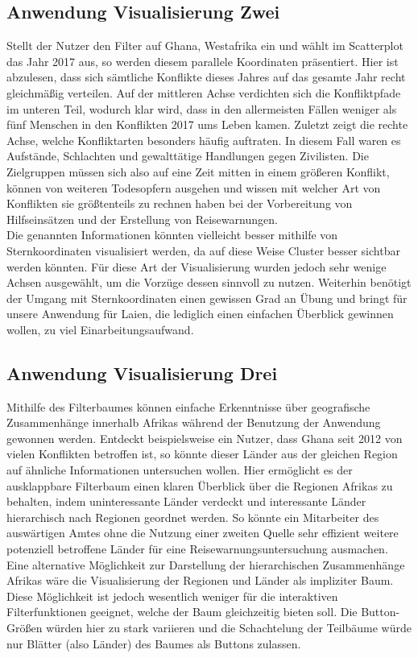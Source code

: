 \documentclass[usegeometry=true]{scrartcl}
\begin{document}
\subsection{Anwendung Visualisierung Zwei}
Stellt der Nutzer den Filter auf Ghana, Westafrika ein und wählt im Scatterplot das Jahr 2017 aus, so werden diesem parallele Koordinaten präsentiert. Hier ist abzulesen, dass sich sämtliche Konflikte dieses Jahres auf das gesamte Jahr recht gleichmäßig verteilen. Auf der mittleren Achse verdichten sich die Konfliktpfade im unteren Teil, wodurch klar wird, dass in den allermeisten Fällen weniger als fünf Menschen in den Konflikten 2017 ums Leben kamen. Zuletzt zeigt die rechte Achse, welche Konfliktarten besonders häufig auftraten. In diesem Fall waren es Aufstände, Schlachten und gewalttätige Handlungen gegen Zivilisten. Die Zielgruppen müssen sich also auf eine Zeit mitten in einem größeren Konflikt, können von weiteren Todesopfern ausgehen und wissen mit welcher Art von Konflikten sie größtenteils zu rechnen haben bei der Vorbereitung von Hilfseinsätzen und der Erstellung von Reisewarnungen.\\ Die genannten Informationen könnten vielleicht besser mithilfe von Sternkoordinaten visualisiert werden, da auf diese Weise Cluster besser sichtbar werden könnten. Für diese Art der Visualisierung wurden jedoch sehr wenige Achsen ausgewählt, um die Vorzüge dessen sinnvoll zu nutzen. Weiterhin benötigt der Umgang mit Sternkoordinaten einen gewissen Grad an Übung und bringt für unsere Anwendung für Laien, die lediglich einen einfachen Überblick gewinnen wollen, zu viel Einarbeitungsaufwand.\\

\subsection{Anwendung Visualisierung Drei}
Mithilfe des Filterbaumes können einfache Erkenntnisse über geografische Zusammenhänge innerhalb Afrikas während der Benutzung der Anwendung gewonnen werden. Entdeckt beispielsweise ein Nutzer, dass Ghana seit 2012 von vielen Konflikten betroffen ist, so könnte dieser Länder aus der gleichen Region auf ähnliche Informationen untersuchen wollen. Hier ermöglicht es der ausklappbare Filterbaum einen klaren Überblick über die Regionen Afrikas zu behalten, indem uninteressante Länder verdeckt und interessante Länder hierarchisch nach Regionen geordnet werden. So könnte ein Mitarbeiter des auswärtigen Amtes ohne die Nutzung einer zweiten Quelle sehr effizient weitere potenziell betroffene Länder für eine Reisewarnungsuntersuchung ausmachen.\\ Eine alternative Möglichkeit zur Darstellung der hierarchischen Zusammenhänge Afrikas wäre die Visualisierung der Regionen und Länder als impliziter Baum. Diese Möglichkeit ist jedoch wesentlich weniger für die interaktiven Filterfunktionen geeignet, welche der Baum gleichzeitig bieten soll. Die Button-Größen würden hier zu stark variieren und die Schachtelung der Teilbäume würde nur Blätter (also Länder) des Baumes als Buttons zulassen.\\
\end{document}
